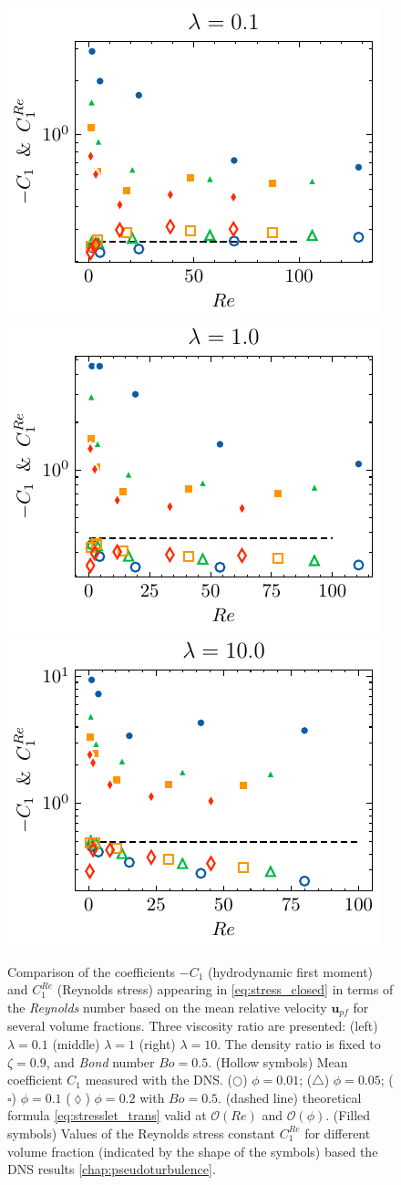 \documentclass{sintefbeamer}
\begin{document}
\begin{frame}
\begin{figure}[h!]
  \centering
  \includegraphics[height = 0.25\textwidth]{image/HOMOGENEOUS_final/PA/Sdev_l_1.pdf}
  \includegraphics[height = 0.25\textwidth]{image/HOMOGENEOUS_final/PA/Sdev_l_10.pdf}
  \includegraphics[height = 0.25\textwidth]{image/HOMOGENEOUS_final/PA/Sdev_l_100.pdf}
  \caption{
      Comparison of the coefficients $-C_1$ (hydrodynamic first moment) and $C_1^{Re}$ (Reynolds stress) appearing in \ref{eq:stress_closed} in terms of the \textit{Reynolds} number based on the mean relative velocity $\textbf{u}_{pf}$ for several volume fractions.
      Three viscosity ratio are presented: (left) $\lambda = 0.1$ (middle) $\lambda = 1$ (right) $\lambda = 10$. 
      The density ratio is fixed to $\zeta = 0.9$, and \textit{Bond} number $Bo =0.5$. 
      (Hollow symbols) Mean coefficient $C_1$ measured with the DNS. 
      ($\pmb\bigcirc$) $\phi = 0.01$; ($\pmb\triangle$) $ \phi = 0.05$; ($\pmb\square$) $\phi = 0.1$ ($\pmb\lozenge$) $\phi = 0.2$ with $Bo = 0.5$.
      (dashed line) theoretical formula \ref{eq:stresslet_trans} valid at $\mathcal{O}(Re)$ and $\mathcal{O}(\phi)$. 
      (Filled symbols) Values of the Reynolds stress constant $C_1^{Re}$ for different volume fraction (indicated by the shape of the symbols) based the DNS results \eqref{chap:pseudoturbulence}. 
   }
   \label{fig:Sdev_DNS}
\end{figure}

\end{frame}
\end{document}
